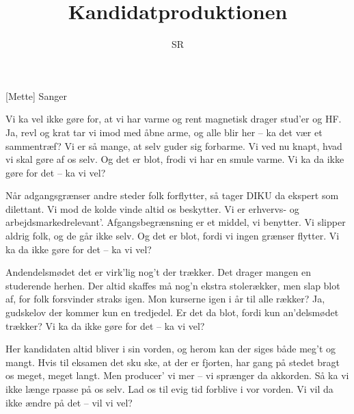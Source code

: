 \documentclass[a4paper,11pt]{article}
\title{Kandidatproduktionen}
\author{SR}
\begin{document}
\maketitle

\begin{roles}
[Mette] Sanger
\end{roles}


\begin{song}
%
Vi ka vel ikke gøre for, at vi har varme
og rent magnetisk drager stud'er og HF.
Ja, revl og krat tar vi imod med åbne arme,
og alle blir her -- ka det vær et sammentræf?
Vi er så mange, at selv guder sig forbarme.
Vi ved nu knapt, hvad vi skal gøre af os selv.
Og det er blot, frodi vi har en smule varme.
Vi ka da ikke gøre for det -- ka vi vel?

Når adgangsgrænser andre steder folk forflytter,
så tager DIKU da ekspert som dilettant.
Vi mod de kolde vinde altid os beskytter.
Vi er erhvervs- og arbejdsmarkedrelevant'.
Afgangsbegrænsning er et middel, vi benytter.
Vi slipper aldrig folk, og de går ikke selv.
Og det er blot, fordi vi ingen grænser flytter.
Vi ka da ikke gøre for det -- ka vi vel?

Andendelsmødet det er virk'lig nog't der trækker.
Det drager mangen en studerende herhen.
Der altid skaffes må nog'n ekstra stolerækker,
men slap blot af, for folk forsvinder straks igen.
Mon kurserne igen i år til alle rækker?
Ja, gudskelov der kommer kun en tredjedel.
Er det da blot, fordi kun an'delsmødet trækker?
Vi ka da ikke gøre for det -- ka vi vel?

Her kandidaten altid bliver i sin vorden,
og herom kan der siges både meg't og mangt.
Hvis til eksamen det sku ske, at der er fjorten,
har gang på stedet bragt os meget, meget langt.
Men producer' vi mer -- vi sprænger da akkorden.
Så ka vi ikke længe rpasse på os selv.
Lad os til evig tid forblive i vor vorden.
Vi vil da ikke ændre på det -- vil vi vel?
\end{song}
\end{document}
